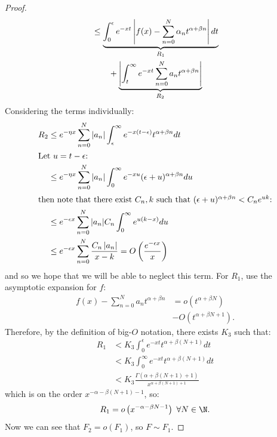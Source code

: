 \documentclass[../Main.tex]{subfiles}
\begin{document}
\begin{proof}
\begin{align*}
        &\leq \underbrace{\int_0^\epsilon e^{-xt} \left|f(x) - \sum_{n=0}^{N} \alpha_n t^{\alpha + \beta n}\right| dt}_{R_1} \\
        &\qquad+ \underbrace{\left|\int_t^\infty e^{-xt} \sum_{n=0}^{N} a_n t^{\alpha + \beta n}\right|}_{R_2} \\
    \end{align*}
    Considering the terms individually:
    \begin{align*}
        R_2 &\leq e^{-\eta x} \sum_{n=0}^{N} \left|a_n\right| \int_\epsilon^\infty e^{-x(t-\epsilon)} t^{\alpha + \beta n} dt \\
        \intertext{Let $u = t - \epsilon$:}
        &\leq e^{-\eta x} \sum_{n=0}^{N} \left|a_n\right| \int_0^\infty e^{-xu} (\epsilon + u)^{\alpha + \beta n} du \\
        \intertext{then note that there exist $C_n, k$ such that $(\epsilon + u)^{\alpha + \beta n} < C_n e^{uk}$:} 
        &\leq e^{-\epsilon x} \sum_{n=0}^{N} |a_n| C_n \int_{0}^{\infty} e^{u(k-x)} du \\
        &\leq e^{-\epsilon x} \sum_{n=0}^{N} \frac{C_n\left|a_n\right|}{x - k} = O\left(\frac{e^{-\epsilon x}}{x}\right)
    \end{align*}
    and so we hope that we will be able to neglect this term. For $R_1$, use the asymptotic expansion for $f$:
    \begin{align*}
        f(x) - \sum_{n=0}^{N} a_n t^{\alpha + \beta n} &= o(t^{\alpha + \beta N}) \\
        &- O(t^{\alpha + \beta N + 1}).
    \end{align*}
    Therefore, by the definition of big-$O$ notation, there exists $K_3$ such that:
    \begin{align*}
        R_1 &< K_3 \int_{0}^{\epsilon} e^{-xt} t^{\alpha + \beta (N + 1)} dt \\
        &< K_3 \int_{0}^{\infty} e^{-xt} t^{\alpha + \beta (N + 1)} dt \\
        &< K_3 \frac{\Gamma(\alpha + \beta (N + 1) + 1)}{x^{\alpha + \beta (N + 1) + 1}}
    \end{align*}
    which is on the order $x^{-\alpha - \beta (N + 1) - 1}$, so:
    \begin{equation*}
        R_1 = o\left(x^{-\alpha - \beta N - 1}\right)~\forall N \in \N.
    \end{equation*}
    Now we can see that $F_2 = o(F_1)$, so $F \sim F_1$.
\end{proof}
\end{document}
